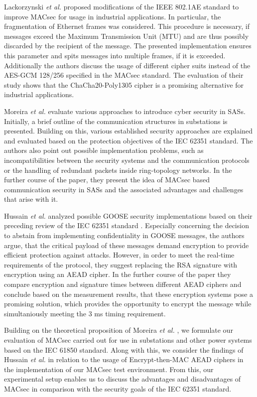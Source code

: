 \documentclass[conference, onecolumn, a4paper]{IEEEtran}
\begin{document}
\smallskip
Lackorzynski \textit{et al.} \cite{MACsecIndustrialOptimization:2020} proposed modifications of the IEEE 802.1AE standard to improve MACsec for usage 
in industrial applications. In particular, the fragmentation of Ethernet frames was considered. This procedure is necessary, if messages exceed the 
Maximum Transmission Unit (MTU) and are thus possibly discarded by the recipient of the message. The presented implementation ensures this parameter 
and spits messages into multiple frames, if it is exceeded. Additionally the authors discuss the usage of different cipher suits instead of the 
AES-GCM 128/256 specified in the MACsec standard. The evaluation of their study shows that the ChaCha20-Poly1305 cipher is a promising alternative 
for industrial applications.

\smallskip
Moreira \textit{et al.} \cite{Cybersecurity_Substation:2016} evaluate various approaches to introduce cyber security in SASs. Initially, a brief outline 
of the communication structures in substations is presented. Building on this, various established security approaches are explained and evaluated based 
on the protection objectives of the IEC 62351 standard. The authors also point out possible implementation problems, such as incompatibilities between 
the security systems and the communication protocols or the handling of redundant packets inside ring-topology networks. In the further course of the 
paper, they present the idea of MACsec based communication security in SASs and the associated advantages and challenges that arise with it. 

\smallskip
Hussain \textit{et al.} \cite{GOOSE_confidentiality_integrity:2020} analyzed possible GOOSE security implementations based on their preceding review 
of the IEC 62351 standard \cite{Review_IEC62351:2019}. Especially concerning the decision to abstain from implementing confidentiality in GOOSE messages, 
the authors argue, that the critical payload of these messages demand encryption to provide efficient protection against attacks. However, in order to 
meet the real-time requirements of the protocol, they suggest replacing the RSA signature with encryption using an AEAD cipher. In the further course 
of the paper they compare encryption and signature times between different AEAD ciphers and conclude based on the measurement results, that these encryption 
systems pose a promising solution, which provides the opportunity to encrypt the message while simultaniously  meeting the 3 ms timing requirement.

\smallskip 
Building on the theoretical proposition of Moreira \textit{et al.} \cite{Cybersecurity_Substation:2016}, we formulate our evaluation of MACsec carried 
out for use in substations and other power systems based on the IEC 61850 standard. Along with this, we consider the findings of Hussain \textit{et al.} 
\cite{GOOSE_confidentiality_integrity:2020} in relation to the usage of Encrypt-then-MAC AEAD ciphers in the implementation of our MACsec test environment. 
From this, our experimental setup enables us to discuss the advantages and disadvantages of MACsec in comparison with the security goals of the IEC 62351 
standard. 
\end{document}
